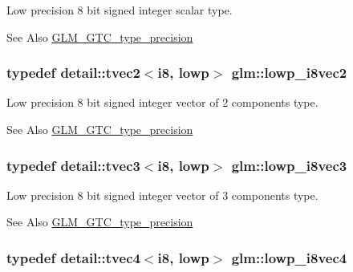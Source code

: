 Low precision 8 bit signed integer scalar type. \begin{DoxySeeAlso}{See Also}
\hyperlink{group__gtc__type__precision}{G\-L\-M\-\_\-\-G\-T\-C\-\_\-type\-\_\-precision} 
\end{DoxySeeAlso}
\hypertarget{group__gtc__type__precision_ga511280c8869c7c79bba3c359f37f5559}{
\subsubsection[{lowp\-\_\-i8vec2}]{\setlength{\rightskip}{0pt plus 5cm}typedef detail\-::tvec2$<$i8, lowp$>$ {\bf glm\-::lowp\-\_\-i8vec2}}}\label{group__gtc__type__precision_ga511280c8869c7c79bba3c359f37f5559}
Low precision 8 bit signed integer vector of 2 components type. \begin{DoxySeeAlso}{See Also}
\hyperlink{group__gtc__type__precision}{G\-L\-M\-\_\-\-G\-T\-C\-\_\-type\-\_\-precision} 
\end{DoxySeeAlso}
\hypertarget{group__gtc__type__precision_ga048811f03c327d4b56564a72d98800e8}{
\subsubsection[{lowp\-\_\-i8vec3}]{\setlength{\rightskip}{0pt plus 5cm}typedef detail\-::tvec3$<$i8, lowp$>$ {\bf glm\-::lowp\-\_\-i8vec3}}}\label{group__gtc__type__precision_ga048811f03c327d4b56564a72d98800e8}
Low precision 8 bit signed integer vector of 3 components type. \begin{DoxySeeAlso}{See Also}
\hyperlink{group__gtc__type__precision}{G\-L\-M\-\_\-\-G\-T\-C\-\_\-type\-\_\-precision} 
\end{DoxySeeAlso}
\hypertarget{group__gtc__type__precision_ga095202095a1fefbdae4a974c3b750223}{
\subsubsection[{lowp\-\_\-i8vec4}]{\setlength{\rightskip}{0pt plus 5cm}typedef detail\-::tvec4$<$i8, lowp$>$ {\bf glm\-::lowp\-\_\-i8vec4}}}\label{group__gtc__type__precision_ga095202095a1fefbdae4a974c3b750223}
